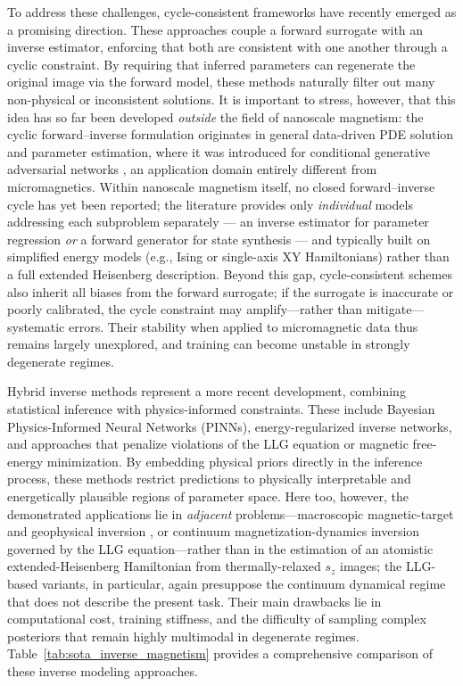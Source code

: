 \documentclass[letterpaper, 12, one column]{article}
\begin{document}
To address these challenges, cycle-consistent frameworks have recently emerged as a
promising direction. These approaches couple a forward surrogate with an inverse
estimator, enforcing that both are consistent with one another through a cyclic
constraint. By requiring that inferred parameters can regenerate the original image via
the forward model, these methods naturally filter out many non-physical or inconsistent
solutions. It is important to stress, however, that this idea has so far been developed
\emph{outside} the field of nanoscale magnetism: the cyclic forward--inverse formulation
originates in general data-driven PDE solution and parameter estimation, where it was
introduced for conditional generative adversarial networks
\cite{Kadeethum2021Framework}, an application domain entirely different from
micromagnetics. Within nanoscale magnetism itself, no closed forward--inverse cycle has
yet been reported; the literature provides only \emph{individual} models addressing each
subproblem separately --- an inverse estimator for parameter regression \emph{or} a
forward generator for state synthesis --- and typically built on simplified energy models
(e.g., Ising or single-axis XY Hamiltonians) rather than a full extended Heisenberg
description. Beyond this gap, cycle-consistent schemes also inherit all biases from the
forward surrogate; if the surrogate is inaccurate or poorly calibrated, the cycle
constraint may amplify---rather than mitigate---systematic errors. Their stability when
applied to micromagnetic data thus remains largely unexplored, and training can become
unstable in strongly degenerate regimes.

Hybrid inverse methods represent a more recent development, combining statistical
inference with physics-informed constraints. These include Bayesian Physics-Informed
Neural Networks (PINNs), energy-regularized inverse networks, and approaches that
penalize violations of the LLG equation or magnetic free-energy minimization. By embedding physical priors directly in
the inference process, these methods restrict predictions to physically interpretable and
energetically plausible regions of parameter space. Here too, however, the demonstrated
applications lie in \emph{adjacent} problems---macroscopic magnetic-target and geophysical
inversion \cite{Lu2024CGLS}, or continuum magnetization-dynamics inversion governed by the
LLG equation---rather than in the estimation of an atomistic extended-Heisenberg Hamiltonian
from thermally-relaxed $s_z$ images; the LLG-based variants, in particular, again presuppose
the continuum dynamical regime that does not describe the present task. Their main drawbacks lie in computational cost,
training stiffness, and the difficulty of sampling complex posteriors that remain highly
multimodal in degenerate regimes. Table~\ref{tab:sota_inverse_magnetism} provides a comprehensive comparison of these inverse modeling approaches.
\end{document}
